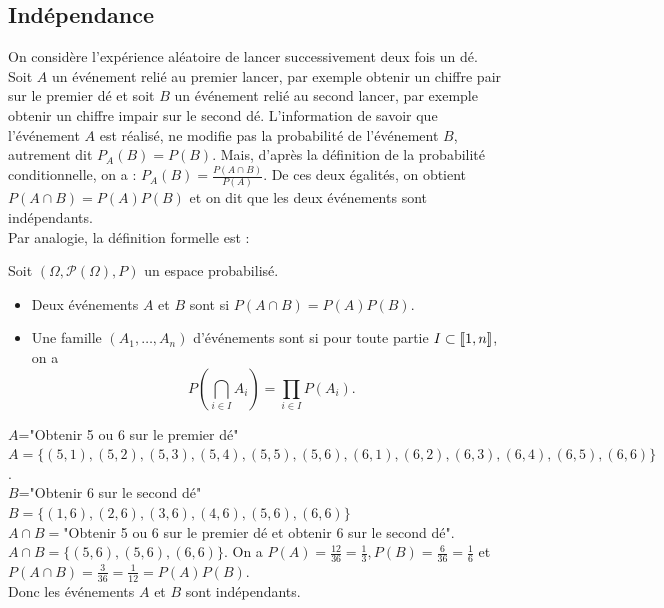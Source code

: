 \documentclass{book}
\begin{document}
\subsection{Indépendance}
On considère l'expérience aléatoire de lancer successivement deux fois un dé.\\
Soit  $A$ un événement relié au premier lancer, par exemple obtenir un chiffre pair sur le premier dé et 
soit  $B$ un événement relié au second lancer, par exemple obtenir un chiffre impair sur le second dé.
L'information de savoir que l'événement $A$ est réalisé, ne modifie pas la probabilité de l'événement $B$, autrement dit $P_A(B) = P(B)$. 
Mais, d'après la définition de la probabilité conditionnelle, on a : $P_A(B) =\frac{P(A\cap B)}{P(A)}$. De ces deux égalités, on obtient $P(A\cap B)=P(A)P(B)$ et on dit que les deux événements sont indépendants.\\ 
Par analogie, la définition formelle est :
\begin{Definition}[Indépendance]

Soit $(\Omega,\mathcal{P}(\Omega),P)$ un espace probabilisé.
\begin{itemize}
\item
  Deux événements $A$ et $B$ sont  si $P(A\cap B)=P(A)P(B)$.
\item
  Une famille $(A_1,\ldots,A_n)$ d'événements sont 
  si pour toute partie $I\subset\mathopen\lbrack\!\lbrack1,n \mathclose\rbrack\!\rbrack$, on a
  \[ P\left( \bigcap_{i\in I} A_i \right) = \prod_{i\in I} P(A_i).\]
\end{itemize}
\end{Definition}
\begin{Exemple}
$A$="Obtenir 5 ou 6 sur le premier dé"\\
$A=\{(5,1),(5,2),(5,3),(5,4),(5,5),(5,6),(6,1),(6,2),(6,3),(6,4),(6,5),(6,6)\}$.\\
$B$="Obtenir  6 sur le second dé"\\
$B=\{(1,6),(2,6),(3,6),(4,6),(5,6),(6,6)\}$\\
$A\cap B=$"Obtenir 5 ou 6 sur le premier dé et obtenir  6 sur le second dé".\\
$A\cap B= \{ (5,6),(5,6),(6,6)\}.$
On a $P(A)=\frac{12}{36}=\frac 1 3 , P(B)=\frac{6}{36}=\frac 1 6$ et $P(A\cap B)=\frac{3}{36}=\frac{1}{12}= P(A)P(B)$.\\
Donc les événements $A$ et $B$ sont indépendants.
\end{Exemple}
\end{document}
